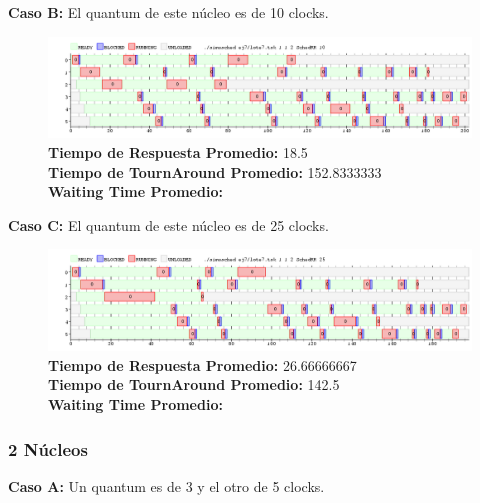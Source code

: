 \documentclass[a4paper]{article}
\begin{document}
	
	\textbf{Caso B:} El quantum de este n\'ucleo es de 10 clocks.
	
		 \begin{figure}[h!]
   \begin{center}
 	\includegraphics[scale=0.5]{imagenes/ej7/1nucleoB.png}
 	\textbf{Tiempo de Respuesta Promedio:} 18.5 \\
 	\textbf{Tiempo de TournAround Promedio:} 152.8333333\\
 	\textbf{Waiting Time Promedio:} \\
   \end{center}
 \end{figure} 
	
	\textbf{Caso C:} El quantum de este n\'ucleo es de 25 clocks.

		 \begin{figure}[h!]
   \begin{center}
 	\includegraphics[scale=0.5]{imagenes/ej7/1nucleoC.png}
 	\textbf{Tiempo de Respuesta Promedio:} 26.66666667 \\
 	\textbf{Tiempo de TournAround Promedio:} 142.5 \\
 	\textbf{Waiting Time Promedio:} \\
   \end{center}
 \end{figure} 	
	
\newpage	
	\subsubsection*{2 N\'ucleos}
	
	\textbf{Caso A:} Un quantum es de 3 y el otro de 5 clocks.
\end{document}
